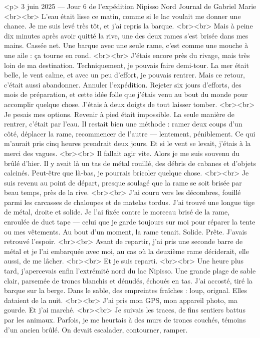 <p>
3 juin 2025 — Jour 6 de l’expédition Nipisso Nord
Journal de Gabriel Marie
<br><br>
L’eau était lisse ce matin, comme si le lac voulait me donner une chance. Je me suis levé très tôt, et j’ai repris la barque.
<br><br>
Mais à peine dix minutes après avoir quitté la rive, une des deux rames s’est brisée dans mes mains. Cassée net. Une barque avec une seule rame, c’est comme une mouche à une aile : ça tourne en rond.
<br><br>
J’étais encore près du rivage, mais très loin de ma destination. Techniquement, je pouvais faire demi-tour. La mer était belle, le vent calme, et avec un peu d’effort, je pouvais rentrer. Mais ce retour, c’était aussi abandonner. Annuler l’expédition. Rejeter six jours d’efforts, des mois de préparation, et cette idée folle que j’étais venu au bout du monde pour accomplir quelque chose. J’étais à deux doigts de tout laisser tomber.
<br><br>
Je pesais mes options. Revenir à pied était impossible. La seule manière de rentrer, c’était par l’eau. Il restait bien une méthode : ramer deux coups d’un côté, déplacer la rame, recommencer de l’autre — lentement, péniblement. Ce qui m’aurait pris cinq heures prendrait deux jours. Et si le vent se levait, j’étais à la merci des vagues.
<br><br>
Il fallait agir vite. Alors je me suis souvenu du brûlé d’hier. Il y avait là un tas de métal rouillé, des débris de cabanes et d’objets calcinés. Peut-être que là-bas, je pourrais bricoler quelque chose.
<br><br>
Je suis revenu au point de départ, presque soulagé que la rame se soit brisée par beau temps, près de la rive.
<br><br>
J’ai couru vers les décombres, fouillé parmi les carcasses de chaloupes et de matelas tordus. J’ai trouvé une longue tige de métal, droite et solide. Je l’ai fixée contre le morceau brisé de la rame, enroulée de duct tape — celui que je garde toujours sur moi pour réparer la tente ou mes vêtements. Au bout d’un moment, la rame tenait. Solide. Prête. J’avais retrouvé l’espoir.
<br><br>
Avant de repartir, j’ai pris une seconde barre de métal et je l’ai embarquée avec moi, au cas où la deuxième rame déciderait, elle aussi, de me lâcher.
<br><br>
Et je suis reparti.
<br><br>
Une heure plus tard, j’apercevais enfin l’extrémité nord du lac Nipisso. Une grande plage de sable clair, parsemée de troncs blanchis et dénudés, échoués en tas. J’ai accosté, tiré la barque sur la berge. Dans le sable, des empreintes fraîches : loup, orignal. Elles dataient de la nuit.
<br><br>
J’ai pris mon GPS, mon appareil photo, ma gourde. Et j’ai marché.
<br><br>
Je suivais les traces, de fins sentiers battus par les animaux. Parfois, je me heurtais à des murs de troncs couchés, témoins d’un ancien brûlé. On devait escalader, contourner, ramper.
